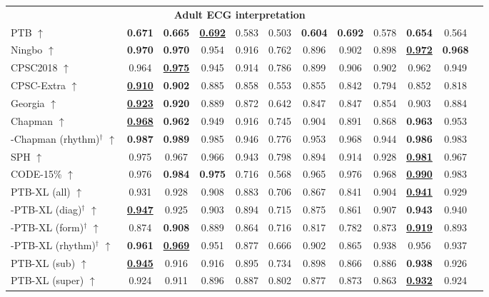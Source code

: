 \documentclass{article}
\begin{document}
\begin{table}[t]
\begin{tabular}{lccccccccccc}
        
                    \multicolumn{11}{c}{\textbf{Adult ECG interpretation }} \\
                    PTB $\uparrow$ & \textbf{0.671} & \textbf{0.665} & \underline{\textbf{0.692}} & 0.583 & 0.503 & \textbf{0.604} & \textbf{0.692} & 0.578 & \textbf{0.654} & 0.564 \\
                    Ningbo $\uparrow$ & \textbf{0.970} & \textbf{0.970} & 0.954 & 0.916 & 0.762 & 0.896 &  0.902  &  0.898 & \underline{\textbf{0.972}} & \textbf{0.968} \\
                    CPSC2018 $\uparrow$ & 0.964 & \underline{\textbf{0.975}} & 0.945 & 0.914 & 0.786 & 0.899 & 0.906 &  0.902 & 0.962 & 0.949 \\
                    CPSC-Extra $\uparrow$ & \underline{\textbf{0.910}} & \textbf{0.902} & 0.885 & 0.858 & 0.553 & 0.855 & 0.842 & 0.794 & 0.852 & 0.818 \\
                    Georgia $\uparrow$ & \underline{\textbf{0.923}} & \textbf{0.920} & 0.889 & 0.872 & 0.642 & 0.847 & 0.847 & 0.854 & 0.903 & 0.884 \\
                    Chapman $\uparrow$ & \underline{\textbf{0.968}} & \textbf{0.962} & 0.949 & 0.916 & 0.745 & 0.904 & 0.891 & 0.868 & \textbf{0.963} & 0.953 \\
                    -Chapman (rhythm)${}^\dagger$ $\uparrow$ & \textbf{0.987} & \textbf{0.989} & 0.985 & 0.946 & 0.776 & 0.953 & 0.968 & 0.944 & \textbf{0.986} & 0.983 \\
                    SPH $\uparrow$ & 0.975 & 0.967 & 0.966 & 0.943 & 0.798 & 0.894 & 0.914 &  0.928 & \underline{\textbf{0.981}} & 0.967 \\
                    CODE-15\% $\uparrow$ & 0.976 & \textbf{0.984} & \textbf{0.975} & 0.716 & 0.568 & 0.965 &  0.976 &  0.968 & \underline{\textbf{0.990}} & 0.983 \\
                    PTB-XL (all) $\uparrow$ & 0.931 & 0.928 & 0.908 & 0.883 & 0.706 & 0.867 & 0.841 & 0.904 & \underline{\textbf{0.941}} & 0.929 \\
                    -PTB-XL (diag)${}^\dagger$ $\uparrow$ & \underline{\textbf{0.947}} & 0.925 & 0.903 & 0.894 & 0.715 & 0.875 & 0.861 & 0.907 & \textbf{0.943} & 0.940 \\
                    -PTB-XL (form)${}^\dagger$ $\uparrow$ & 0.874 & \textbf{0.908} & 0.889 & 0.864 & 0.716 & 0.817 & 0.782 & 0.873 & \underline{\textbf{0.919}} & 0.893 \\
                    -PTB-XL (rhythm)${}^\dagger$ $\uparrow$ & \textbf{0.961} & \underline{\textbf{0.969}} & 0.951 & 0.877 & 0.666 & 0.902 & 0.865 & 0.938 & 0.956 & 0.937 \\
                    PTB-XL (sub) $\uparrow$ & \underline{\textbf{0.945}} & 0.916 & 0.916 & 0.895 & 0.734 & 0.898 & 0.866  &  0.886 & \textbf{0.938} & 0.926 \\
                    PTB-XL (super) $\uparrow$ & 0.924 & 0.911 & 0.896 & 0.887 & 0.802 & 0.877 & 0.873  &  0.863 & \underline{\textbf{0.932}} & 0.924  \\
                    \midrule
        

\end{tabular}
\end{table}
\end{document}
